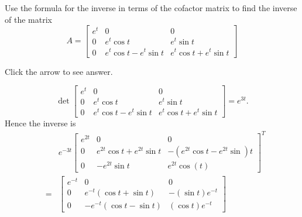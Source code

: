 \documentclass{ximera}
\begin{document}
\begin{problem}\label{prb:7.38} Use the formula for the inverse in terms of the cofactor matrix to
find the inverse of the matrix
\begin{equation*}
A=\left[
\begin{array}{ccc}
e^{t} & 0 & 0 \\
0 & e^{t}\cos t & e^{t}\sin t \\
0 & e^{t}\cos t-e^{t}\sin t & e^{t}\cos t+e^{t}\sin t
\end{array}
\right]
\end{equation*}

Click the arrow to see answer.
\begin{expandable}
\[
\det \left[
\begin{array}{ccc}
e^{t} & 0 & 0 \\
0 & e^{t}\cos t & e^{t}\sin t \\
0 & e^{t}\cos t-e^{t}\sin t & e^{t}\cos t+e^{t}\sin t
\end{array}
\right] = e^{3t}.
\]
Hence the inverse is
\begin{eqnarray*}
&&e^{-3t}\left[
\begin{array}{ccc}
e^{2t} & 0 & 0 \\
0 & e^{2t}\cos t+e^{2t}\sin t & -\left( e^{2t}\cos t-e^{2t}\sin \right) t \\
0 & -e^{2t}\sin t & e^{2t}\cos \left( t\right)
\end{array}
\right] ^{T} \\
&=& \left[
\begin{array}{ccc}
e^{-t} & 0 & 0 \\
0 & e^{-t}\left( \cos t+\sin t\right)  & -\left( \sin t\right) e^{-t} \\
0 & -e^{-t}\left( \cos t-\sin t\right)  & \left( \cos t\right) e^{-t}
\end{array}
\right]
\end{eqnarray*}
\end{expandable}
\end{problem}
\end{document}
